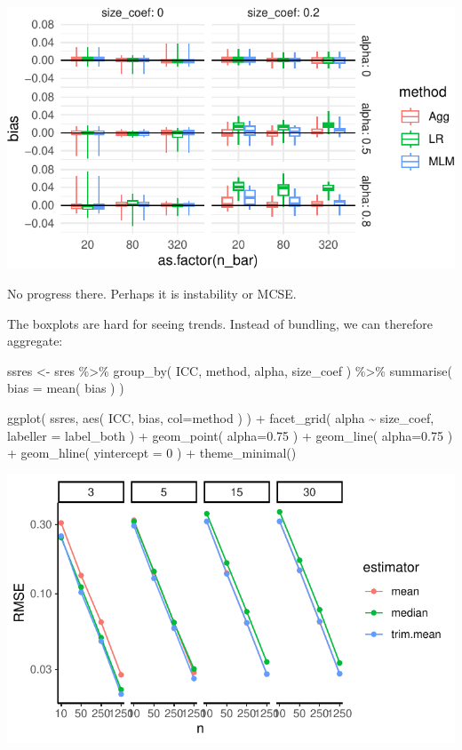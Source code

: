 \documentclass[
]{book}
\newenvironment{Shaded}{\begin{snugshade}}{\end{snugshade}}
\newcommand{\AttributeTok}[1]{\textcolor[rgb]{0.77,0.63,0.00}{#1}}
\newcommand{\DecValTok}[1]{\textcolor[rgb]{0.00,0.00,0.81}{#1}}
\newcommand{\FloatTok}[1]{\textcolor[rgb]{0.00,0.00,0.81}{#1}}
\newcommand{\FunctionTok}[1]{\textcolor[rgb]{0.00,0.00,0.00}{#1}}
\newcommand{\NormalTok}[1]{#1}
\newcommand{\OtherTok}[1]{\textcolor[rgb]{0.56,0.35,0.01}{#1}}
\newcommand{\SpecialCharTok}[1]{\textcolor[rgb]{0.00,0.00,0.00}{#1}}
\begin{document}
\begin{center}\includegraphics[width=0.75\linewidth]{Designing-Simulations-in-R_files/figure-latex/clusterRCT_plot_bias_v2-1} \end{center}

No progress there. Perhaps it is instability or MCSE.

The boxplots are hard for seeing trends.
Instead of bundling, we can therefore aggregate:

\begin{Shaded}
\begin{Highlighting}[]
\NormalTok{ssres }\OtherTok{\textless{}{-}} 
\NormalTok{  sres }\SpecialCharTok{\%\textgreater{}\%} 
  \FunctionTok{group\_by}\NormalTok{( ICC, method, alpha, size\_coef ) }\SpecialCharTok{\%\textgreater{}\%}
  \FunctionTok{summarise}\NormalTok{( }\AttributeTok{bias =} \FunctionTok{mean}\NormalTok{( bias ) )}

\FunctionTok{ggplot}\NormalTok{( ssres, }\FunctionTok{aes}\NormalTok{( ICC, bias, }\AttributeTok{col=}\NormalTok{method ) ) }\SpecialCharTok{+}
  \FunctionTok{facet\_grid}\NormalTok{( alpha }\SpecialCharTok{\textasciitilde{}}\NormalTok{  size\_coef, }\AttributeTok{labeller =}\NormalTok{ label\_both ) }\SpecialCharTok{+}
  \FunctionTok{geom\_point}\NormalTok{( }\AttributeTok{alpha=}\FloatTok{0.75}\NormalTok{ ) }\SpecialCharTok{+} 
  \FunctionTok{geom\_line}\NormalTok{( }\AttributeTok{alpha=}\FloatTok{0.75}\NormalTok{ ) }\SpecialCharTok{+}
  \FunctionTok{geom\_hline}\NormalTok{( }\AttributeTok{yintercept =} \DecValTok{0}\NormalTok{ ) }\SpecialCharTok{+}
  \FunctionTok{theme\_minimal}\NormalTok{()}
\end{Highlighting}
\end{Shaded}

\begin{center}\includegraphics[width=0.75\linewidth]{Designing-Simulations-in-R_files/figure-latex/unnamed-chunk-163-1} \end{center}
\end{document}
